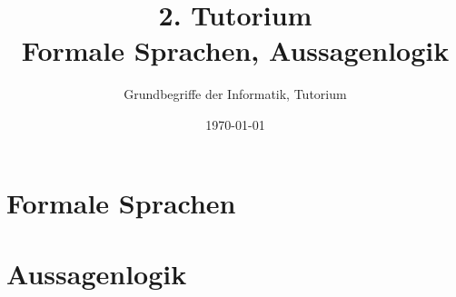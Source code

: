 




\title[Formale Sprachen, Aussagenlogik]{2. Tutorium\\ Formale Sprachen, Aussagenlogik}
\subtitle{Grundbegriffe der Informatik, Tutorium \hashtag\mytutnumber}
\date{\today}


\titleframe
\roadmap


\section{Formale Sprachen}


\section{Aussagenlogik}


\section{}
\questionframe
\lastframe
{}

